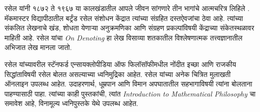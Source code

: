 \documentclass[../../../include/open-logic-section]{subfiles}
\begin{document}
\begin{reading}
रसेल यांनी १८७२ ते १९६७ या कालखंडातील आपले जीवन सांगणारे तीन भागांचे आत्मचरित्र लिहिले \citep{Russell1967,Russell1968,Russell1969}. मॅकमास्टर विद्यापीठातील बर्ट्रंड रसेल संशोधन केंद्रात त्यांच्या संग्रहित दस्तऐवजांचा ठेवा आहे. त्यांच्या संकलित लेखनाचे खंड, शोधता येणाऱ्या अनुक्रमणिका आणि संग्रहण प्रकल्पांविषयी केंद्राच्या संकेतस्थळावर \citet{Duncan2015} माहिती आहे. रसेल यांचा \emph{On
  Denoting} \citep{Russell1905} हा लेख विसाव्या शतकातील विश्लेषणात्मक तत्त्वज्ञानातील अभिजात लेख मानला जातो.

रसेल यांच्यावरील स्टॅनफर्ड एन्सायक्लोपीडिया ऑफ फिलॉसॉफीमधील नोंदीत \citep{Irvine2015} इच्छा आणि राजकीय सिद्धांताविषयी रसेल बोलत असल्याच्या ध्वनिमुद्रिका आहेत. रसेल यांच्या अनेक चित्रित मुलाखती ऑनलाइन उपलब्ध आहेत. उदाहरणार्थ, धूम्रपान आणि विमान अपघातातील सहभागाविषयी त्यांना बोलताना पाहण्यासाठी \citet{RussellND} पाहा. त्यांच्या काही पुस्तकांची, त्यांत \emph{Introduction to Mathematical Philosophy} चा समावेश आहे, विनामूल्य ध्वनिपुस्तके \citet{LibriVoxND} येथे उपलब्ध आहेत.
\end{reading}
\end{document}
